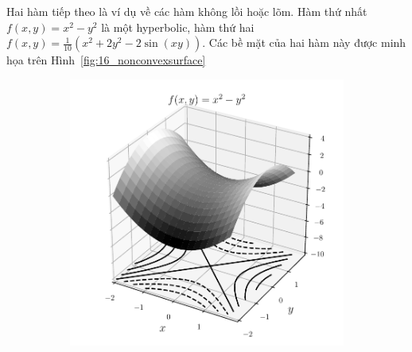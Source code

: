 Hai hàm tiếp theo là ví dụ về các hàm không lồi hoặc lõm. Hàm
thứ nhất $f(x, y) = x^2 - y^2$ là một hyperbolic, hàm thứ hai $f(x,y) =
\frac{1}{10}(x^2 + 2y^2 - 2\sin(xy)) $. Các bề mặt của hai hàm này được minh
họa trên Hình~\ref{fig:16_nonconvexsurface}
 
 
 
\begin{figure}[t]
    \begin{subfigure}{0.48\textwidth}
    \includegraphics[width=0.95\linewidth]{ebookML_src/src/convexity/hyperbol.pdf}
    \end{subfigure}
    \begin{subfigure}{0.48\textwidth}

\end{subfigure}
\end{figure}
